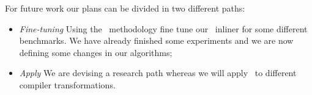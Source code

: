 For future work our plans can be divided in two different paths:
\begin{itemize}
\item {\it Fine-tuning} Using the \CP\ methodology fine tune our \FDI\ inliner for some different benchmarks. We have already finished some experiments and we are now defining some changes in our algorithms;

\item {\it Apply \CP} We are devising a research path whereas we will apply \CP\ to different compiler transformations.

\end{itemize}
